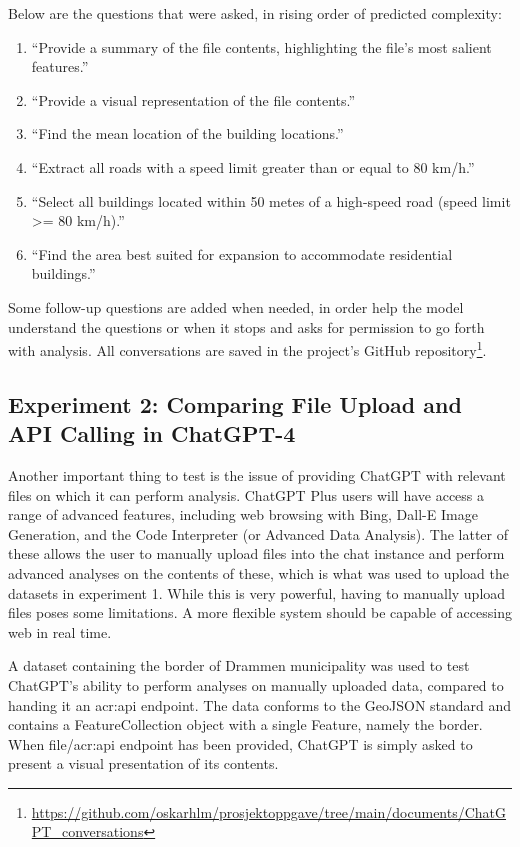 Below are the questions that were asked, in rising order of predicted complexity:

\begin{enumerate}
    \item \enquote{Provide a summary of the file contents, highlighting the file's most salient features.}
    \item \enquote{Provide a visual representation of the file contents.}
    \item \enquote{Find the mean location of the building locations.}
    \item \enquote{Extract all roads with a speed limit greater than or equal to 80 km/h.}
    \item \enquote{Select all buildings located within 50 metes of a high-speed road (speed limit >= 80 km/h).}
    \item \enquote{Find the area best suited for expansion to accommodate residential buildings.}
\end{enumerate}
\label{enum:gpt-gis-questions}

Some follow-up questions are added when needed, in order help the model understand the questions or when it stops and asks for permission to go forth with analysis. All conversations are saved in the project's GitHub repository\footnote{\url{https://github.com/oskarhlm/prosjektoppgave/tree/main/documents/ChatGPT_conversations}}.

\subsection{Experiment 2: Comparing File Upload and API Calling in ChatGPT-4}

Another important thing to test is the issue of providing ChatGPT with relevant files on which it can perform analysis. ChatGPT Plus users will have access a range of advanced features, including web browsing with Bing, Dall-E Image Generation, and the Code Interpreter (or Advanced Data Analysis). The latter of these allows the user to manually upload files into the chat instance and perform advanced analyses on the contents of these, which is what was used to upload the datasets in experiment 1. While this is very powerful, having to manually upload files poses some limitations. A more flexible system should be capable of accessing web  in real time.

A dataset containing the border of Drammen municipality was used to test ChatGPT's ability to perform analyses on manually uploaded data, compared to handing it an \acrshort{acr:api} endpoint. The data conforms to the GeoJSON standard and contains a FeatureCollection object with a single Feature, namely the border. When file/\acrshort{acr:api} endpoint has been provided, ChatGPT is simply asked to present a visual presentation of its contents.

